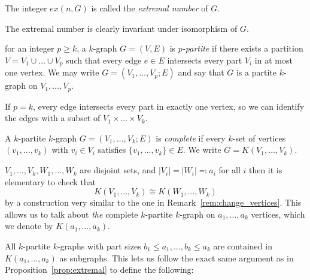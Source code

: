 \begin {definition}
    The integer $ex(n, G)$ is called the \emph{extremal number} of $G$.
\end{definition}

\begin{remark}
    The extremal number is clearly invariant under isomorphism of $G$.
\end{remark}

\begin{definition}
    for an integer $p \geq k$, a $k$-graph $G = (V, E)$ is \emph{$p$-partite}
    if there exists a partition $V = V_1 \cup \dots \cup V_p$
    such that every edge $e \in E$ intersects every part $V_i$ in at most one vertex.
    We may write $G = (V_1, \dots, V_p; E)$ and say that
    $G$ is a partite $k$-graph on $V_1, \dots, V_p$.
\end{definition}


\begin{remark}
    If $p=k$, every edge intersects every part in exactly one vertex,
    so we can identify the edges with a subset of $ V_1 \times \dots \times V_k$.
\end{remark}

\begin{definition}
    A $k$-partite $k$-graph $G = (V_1, \dots, V_k; E)$ is \emph{complete}
    if every $k$-set of vertices $(v_1, \dots, v_k)$ with $v_i \in V_i$
    satisfies $\{v_1, \dots, v_k\} \in E$.
    We write $G = K(V_1, \dots, V_k)$.
\end{definition}

\begin{remark}
    $V_1, \dots, V_k, W_1, \dots, W_k$ are disjoint sets,
    and $|V_i| = |W_i| \eqqcolon a_i$ for all $i$ then it is elementary to check that
    \[
        K(V_1, \dots, V_k) \cong K(W_1, \dots, W_k)
    \]
    by a construction very similar to the one in Remark~\ref{rem:change_vertices}.
    This allows us to talk about \emph{the} complete $k$-partite $k$-graph on
    $a_1, \dots, a_k$ vertices, which we denote by $K(a_1, \dots, a_k)$.
\end{remark}

\begin{remark}
    All $k$-partite $k$-graphs with part sizes $b_1 \leq a_1, \dots, b_k \leq a_k$
    are contained in $K(a_1, \dots, a_k)$ as subgraphs.
    This lets us follow the exact same argument as in Proposition~\ref{prop:extremal}
    to define the following:
\end{remark}

